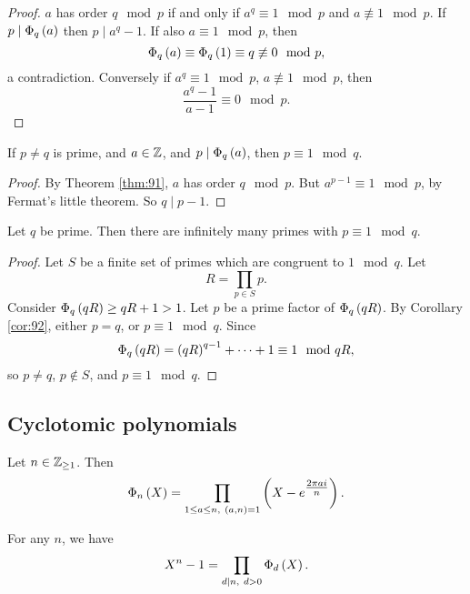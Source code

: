 \begin{proof}
$ a $ has order $ q \mod p $ if and only if $ a^q \equiv 1 \mod p $ and $ a \not\equiv 1 \mod p $. If $ p \mid \Phi_q\br{a} $ then $ p \mid a^q - 1 $. If also $ a \equiv 1 \mod p $, then
$$ \Phi_q\br{a} \equiv \Phi_q\br{1} \equiv q \not\equiv 0 \mod p, $$
a contradiction. Conversely if $ a^q \equiv 1 \mod p $, $ a \not\equiv 1 \mod p $, then
$$ \dfrac{a^q - 1}{a - 1} \equiv 0 \mod p. $$
\end{proof}


\begin{corollary}
\label{cor:92}
If $ p \ne q $ is prime, and $ a \in \mathbb{Z} $, and $ p \mid \Phi_q\br{a} $, then $ p \equiv 1 \mod q $.
\end{corollary}

\begin{proof}
By Theorem \ref{thm:91}, $ a $ has order $ q \mod p $. But $ a^{p - 1} \equiv 1 \mod p $, by Fermat's little theorem. So $ q \mid p - 1 $.
\end{proof}

\begin{theorem}
Let $ q $ be prime. Then there are infinitely many primes with $ p \equiv 1 \mod q $.
\end{theorem}

\begin{proof}
Let $ S $ be a finite set of primes which are congruent to $ 1 \mod q $. Let
$$ R = \prod_{p \in S} p. $$
Consider $ \Phi_q\br{qR} \ge qR + 1 > 1 $. Let $ p $ be a prime factor of $ \Phi_q\br{qR} $. By Corollary \ref{cor:92}, either $ p = q $, or $ p \equiv 1 \mod q $. Since
$$ \Phi_q\br{qR} = \br{qR}^{q - 1} + \dots + 1 \equiv 1 \mod qR, $$
so $ p \ne q $, $ p \notin S $, and $ p \equiv 1 \mod q $.
\end{proof}

\subsection{Cyclotomic polynomials}

\begin{definition}
Let $ n \in \mathbb{Z}_{\ge 1} $. Then
$$ \Phi_n\br{X} = \prod_{1 \le a \le n, \ \br{a, n} = 1} \br{X - e^{\tfrac{2\pi ai}{n}}}. $$
\end{definition}

\begin{lemma}
\label{lem:95}
For any $ n $, we have
$$ X^n - 1 = \prod_{d \mid n, \ d > 0} \Phi_d\br{X}. $$
\end{lemma}

